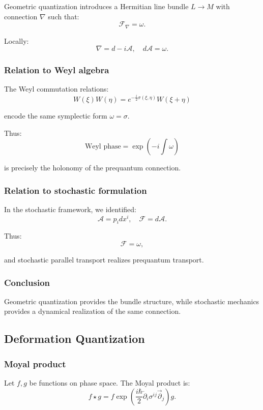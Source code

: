 \documentclass[11pt]{article}
\begin{document}
Geometric quantization introduces a Hermitian line bundle $L \to M$ with connection $\nabla$ such that:
\[
\mathcal{F}_\nabla = \omega.
\]

Locally:
\[
\nabla = d - i \mathcal{A}, \quad d\mathcal{A} = \omega.
\]

\subsubsection{Relation to Weyl algebra}

The Weyl commutation relations:
\[
W(\xi)W(\eta) = e^{-\frac{i}{2}\sigma(\xi,\eta)} W(\xi+\eta)
\]

encode the same symplectic form $\omega = \sigma$.

Thus:
\[
\text{Weyl phase} = \exp\left(-i \int \omega \right)
\]

is precisely the holonomy of the prequantum connection.

\subsubsection{Relation to stochastic formulation}

In the stochastic framework, we identified:
\[
\mathcal{A} = p_i dx^i, \quad \mathcal{F} = d\mathcal{A}.
\]

Thus:
\[
\mathcal{F} = \omega,
\]

and stochastic parallel transport realizes prequantum transport.

\subsubsection*{Conclusion}

Geometric quantization provides the bundle structure, while stochastic mechanics provides a dynamical realization of the same connection.

\subsection{Deformation Quantization}

\subsubsection{Moyal product}

Let $f,g$ be functions on phase space. The Moyal product is:
\[
f \star g = f \exp\left(
\frac{i\hbar}{2} \overleftarrow{\partial}_i \sigma^{ij} \overrightarrow{\partial}_j
\right) g.
\]
\end{document}
